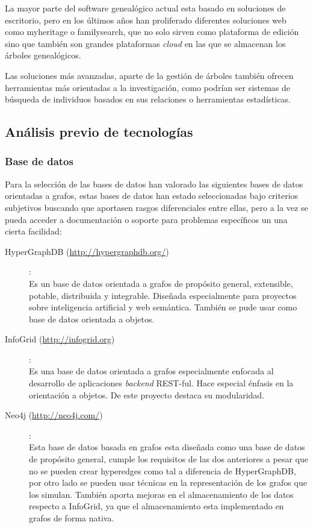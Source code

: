 La mayor parte del software genealógico actual esta basado en soluciones de escritorio, pero en los últimos años han proliferado diferentes soluciones web como myheritage o familysearch, que no solo sirven como plataforma de edición sino que también son grandes plataformas \textit{cloud} en las que se almacenan los árboles genealógicos.

Las soluciones más avanzadas, aparte de la gestión de árboles también ofrecen herramientas más orientadas a la investigación, como podrían ser sistemas de búsqueda de individuos basados en sus relaciones o herramientas estadísticas.

\subsection{Análisis previo de tecnologías}

\subsubsection{Base de datos}
Para la selección de las bases de datos han valorado las siguientes bases de datos orientadas a grafos, estas bases de datos han estado seleccionadas bajo criterios subjetivos buscando que aportasen rasgos diferenciales entre ellas, pero a la vez se pueda acceder a documentación o soporte para problemas específicos un una cierta facilidad:

\begin{description}
\item[HyperGraphDB (\url{http://hypergraphdb.org/})]:
\\Es un base de datos orientada a grafos de propósito general, extensible, potable, distribuida y integrable. Diseñada especialmente para proyectos sobre inteligencia artificial y web semántica. También se pude usar como base de datos orientada a objetos.
\item[InfoGrid (\url{http://infogrid.org})]:
\\Es una base de datos orientada a grafos especialmente enfocada al desarrollo de aplicaciones \textit{backend} REST-ful. Hace especial énfasis en la orientación a objetos. De este proyecto destaca su modularidad. 
\item[Neo4j (\url{http://neo4j.com/})]:
\\Esta base de datos basada en grafos esta diseñada como una base de datos de propósito general, cumple los requisitos de las dos anteriores a pesar que no se pueden crear hyperedges como tal a diferencia de HyperGraphDB, por otro lado se pueden usar técnicas en la representación de los grafos que los simulan. También aporta mejoras en el almacenamiento de los datos respecto a InfoGrid, ya que el almacenamiento esta implementado en grafos de forma nativa.
\end{description}

